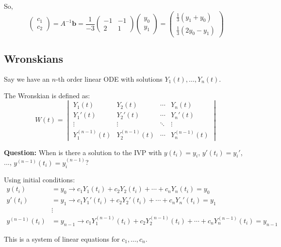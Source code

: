 \documentclass{article}
\begin{document}
So,
\[
\begin{pmatrix}
c_1 \\
c_2
\end{pmatrix}
= A^{-1} \mathbf{b} = \frac{1}{-3} \begin{pmatrix}
-1 & -1 \\
2 & 1
\end{pmatrix}
\begin{pmatrix}
y_0 \\
y_1
\end{pmatrix}
= \begin{pmatrix}
\frac{1}{3}(y_1 + y_0) \\
\frac{1}{3}(2y_0 - y_1)
\end{pmatrix}
\]

\subsection*{Wronskians}

Say we have an \( n \)-th order linear ODE with solutions \( Y_1(t), \ldots, Y_n(t) \).

The Wronskian is defined as:
\[
W(t) = \begin{vmatrix}
Y_1(t) & Y_2(t) & \cdots & Y_n(t) \\
Y_1'(t) & Y_2'(t) & \cdots & Y_n'(t) \\
\vdots & \vdots & \ddots & \vdots \\
Y_1^{(n-1)}(t) & Y_2^{(n-1)}(t) & \cdots & Y_n^{(n-1)}(t)
\end{vmatrix}
\]

\textbf{Question:} When is there a solution to the IVP with \( y(t_i) = y_i \), \( y'(t_i) = y_i' \), ..., \( y^{(n-1)}(t_i) = y_i^{(n-1)} \)?

Using initial conditions:
\[
\begin{aligned}
y(t_i) &= y_0 \rightarrow c_1 Y_1(t_i) + c_2 Y_2(t_i) + \cdots + c_n Y_n(t_i) = y_0 \\
y'(t_i) &= y_1 \rightarrow c_1 Y_1'(t_i) + c_2 Y_2'(t_i) + \cdots + c_n Y_n'(t_i) = y_1 \\
&\vdots \\
y^{(n-1)}(t_i) &= y_{n-1} \rightarrow c_1 Y_1^{(n-1)}(t_i) + c_2 Y_2^{(n-1)}(t_i) + \cdots + c_n Y_n^{(n-1)}(t_i) = y_{n-1}
\end{aligned}
\]

This is a system of linear equations for \( c_1, \ldots, c_n \).
\end{document}
